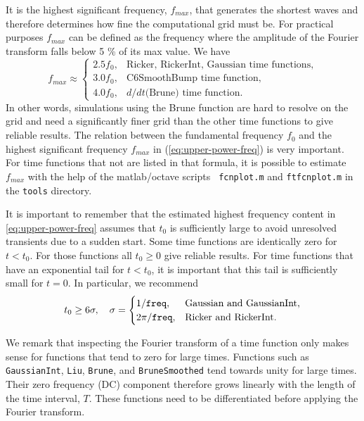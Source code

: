 \documentclass[11pt]{report}
\begin{document}
It is the highest significant frequency, $f_{max}$, that generates the shortest waves
and therefore determines how fine the computational grid must be. For practical purposes $f_{max}$
can be defined as the frequency where the amplitude of the Fourier transform falls below 5 \% of its
max value. We have
\begin{equation}\label{eq:upper-power-freq}
f_{max} \approx \begin{cases}
2.5 f_0,&\mbox{Ricker, RickerInt, Gaussian time functions},\\
3.0 f_0,&\mbox{C6SmoothBump time function},\\
4.0 f_0,&\mbox{$d/dt$(Brune) time function}.
\end{cases}
\end{equation}
In other words, simulations using the Brune function are hard to resolve on the grid and need a
significantly finer grid than the other time functions to give reliable results. The relation
between the fundamental frequency $f_0$ and the highest significant frequency $f_{max}$ in
(\ref{eq:upper-power-freq}) is very important. For time functions that not are listed in that
formula, it is possible to estimate $f_{max}$ with the help of the matlab/octave scripts {\tt
  fcnplot.m} and {\tt ftfcnplot.m} in the {\tt tools} directory.

It is important to remember that the estimated highest frequency content in
\eqref{eq:upper-power-freq} assumes that $t_0$ is sufficiently large to avoid unresolved transients
due to a sudden start. Some time functions are identically zero for $t<t_0$. For those functions all
$t_0\geq 0$ give reliable results. For time functions that have an exponential tail for $t<t_0$, it
is important that this tail is sufficiently small for $t=0$. In particular, we recommend
\[
t_0 \geq 6\sigma,\quad \sigma=\begin{cases}
1/{\tt freq},& \mbox{Gaussian and GaussianInt},\\
2\pi/{\tt freq},& \mbox{Ricker and RickerInt}.
\end{cases}
\]

We remark that inspecting the Fourier transform of a time function only makes sense for functions
that tend to zero for large times. Functions such as {\tt GaussianInt}, {\tt Liu}, {\tt Brune}, and
{\tt BruneSmoothed} tend towards unity for large times. Their zero frequency (DC) component
therefore grows linearly with the length of the time interval, $T$. These functions need to be
differentiated before applying the Fourier transform.
\end{document}
